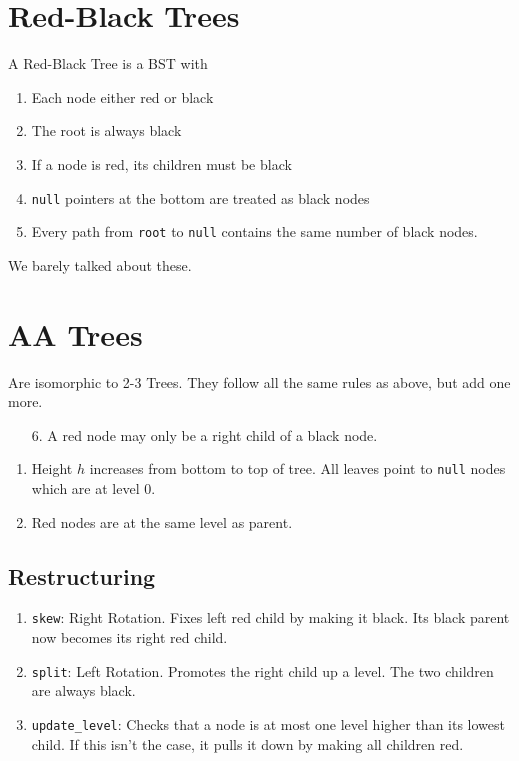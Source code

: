 \documentclass[12pt, letterpaper]{article}
\begin{document}
\begin{multicols*}{3}
        \section{Red-Black Trees}
        A Red-Black Tree is a BST with
        \begin{enumerate}
            \item Each node either red or black
            \item The root is always black
            \item If a node is red, its children must be black
            \item \texttt{null} pointers at the bottom are treated as black nodes
            \item Every path from \texttt{root} to \texttt{null} contains the same number of black nodes.
        \end{enumerate}

        We barely talked about these.


        
        \section{AA Trees}
        Are isomorphic to 2-3 Trees. They follow all the same rules as above, but add one more.
        \begin{enumerate}
            \item[6.] A red node may only be a right child of a black node.
        \end{enumerate}

        \begin{enumerate}
            \item Height $h$ increases from bottom to top of tree. All leaves point to \texttt{null} nodes which are at level $0$.
            \item Red nodes are at the same level as parent.
        \end{enumerate}


        \subsection{Restructuring}
        \begin{enumerate}
            \item \texttt{skew}: Right Rotation. Fixes left red child by making it black. Its black parent now becomes its right red child.
            \item \texttt{split}: Left Rotation. Promotes the right child up a level. The two children are always black.
            \item \texttt{update\_level}: Checks that a node is at most one level higher than its lowest child. If this isn't the case, it pulls it down by making all children red.
        \end{enumerate}




\end{multicols*}
\end{document}
